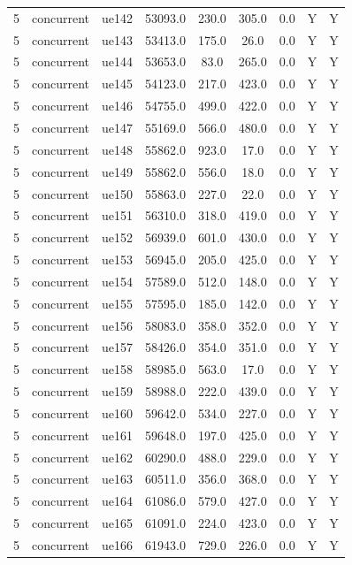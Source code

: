 \begin{table}[ht]
\begin{tabular}{|c|c|c|c|c|c|c|c|c|}
5 & concurrent & ue142 & 53093.0 & 230.0 & 305.0 & 0.0 & Y & Y \\
5 & concurrent & ue143 & 53413.0 & 175.0 & 26.0 & 0.0 & Y & Y \\
5 & concurrent & ue144 & 53653.0 & 83.0 & 265.0 & 0.0 & Y & Y \\
5 & concurrent & ue145 & 54123.0 & 217.0 & 423.0 & 0.0 & Y & Y \\
5 & concurrent & ue146 & 54755.0 & 499.0 & 422.0 & 0.0 & Y & Y \\
5 & concurrent & ue147 & 55169.0 & 566.0 & 480.0 & 0.0 & Y & Y \\
5 & concurrent & ue148 & 55862.0 & 923.0 & 17.0 & 0.0 & Y & Y \\
5 & concurrent & ue149 & 55862.0 & 556.0 & 18.0 & 0.0 & Y & Y \\
5 & concurrent & ue150 & 55863.0 & 227.0 & 22.0 & 0.0 & Y & Y \\
5 & concurrent & ue151 & 56310.0 & 318.0 & 419.0 & 0.0 & Y & Y \\
5 & concurrent & ue152 & 56939.0 & 601.0 & 430.0 & 0.0 & Y & Y \\
5 & concurrent & ue153 & 56945.0 & 205.0 & 425.0 & 0.0 & Y & Y \\
5 & concurrent & ue154 & 57589.0 & 512.0 & 148.0 & 0.0 & Y & Y \\
5 & concurrent & ue155 & 57595.0 & 185.0 & 142.0 & 0.0 & Y & Y \\
5 & concurrent & ue156 & 58083.0 & 358.0 & 352.0 & 0.0 & Y & Y \\
5 & concurrent & ue157 & 58426.0 & 354.0 & 351.0 & 0.0 & Y & Y \\
5 & concurrent & ue158 & 58985.0 & 563.0 & 17.0 & 0.0 & Y & Y \\
5 & concurrent & ue159 & 58988.0 & 222.0 & 439.0 & 0.0 & Y & Y \\
5 & concurrent & ue160 & 59642.0 & 534.0 & 227.0 & 0.0 & Y & Y \\
5 & concurrent & ue161 & 59648.0 & 197.0 & 425.0 & 0.0 & Y & Y \\
5 & concurrent & ue162 & 60290.0 & 488.0 & 229.0 & 0.0 & Y & Y \\
5 & concurrent & ue163 & 60511.0 & 356.0 & 368.0 & 0.0 & Y & Y \\
5 & concurrent & ue164 & 61086.0 & 579.0 & 427.0 & 0.0 & Y & Y \\
5 & concurrent & ue165 & 61091.0 & 224.0 & 423.0 & 0.0 & Y & Y \\
5 & concurrent & ue166 & 61943.0 & 729.0 & 226.0 & 0.0 & Y & Y \\

\end{tabular}
\end{table}
